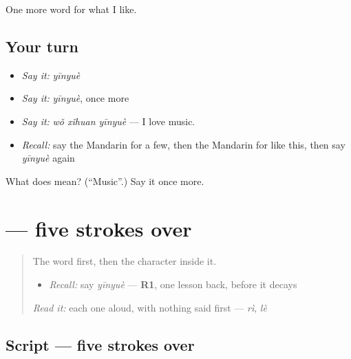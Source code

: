 \begin{grammarlens}[title={What you've built}]
One more word for what I like.
\end{grammarlens}

\subsection*{Your turn}
\begin{itemize}
\raggedright
  \item \emph{Say it:} \emph{yīnyuè}
  \item \emph{Say it:} \emph{yīnyuè}, once more
  \item \emph{Say it:} \emph{wǒ xǐhuan yīnyuè} — I love music.
  \item \emph{Recall:} say the Mandarin for a few, then the Mandarin for like this, then say \emph{yīnyuè} again
\end{itemize}

\begin{tcolorbox}[breakable,colback=teal!4,colframe=teal!35!black,title={Before you move on}]
What does  mean? (\textquotedblleft{}Music\textquotedblright{}.) Say it once more.
\end{tcolorbox}
\section[\texorpdfstring{\zh{音} (yīn)}{音 (yīn)}]{ — five strokes over }

\label{lesson:ZH-W128-yin-sound}



\begin{quote}
The word first, then the character inside it.

\begin{itemize}
\raggedright
  \item \emph{Recall:} say \emph{yīnyuè} — \textbf{R1}, one lesson back, before it decays
\end{itemize}

\begin{quote}
 
\end{quote}

\emph{Read it:} each one aloud, with nothing said first — \emph{rì}, \emph{lè}
\end{quote}

\subsection*{Script — five strokes over }

